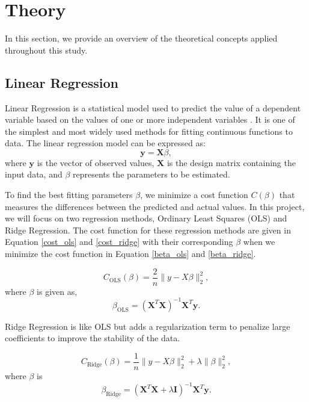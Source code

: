 \documentclass{article}
\newcommand{\0}{\mathbf{0}}
\newcommand{\1}{\mathbf{1}}
\begin{document}
\section{Theory}

In this section, we provide an overview of the theoretical concepts applied throughout this study.

\subsection{Linear Regression}

Linear Regression is a statistical model used to predict the value of a dependent variable based on the values of one or more independent variables \cite{ibm_linear_regression}. It is one of the simplest and most widely used methods for fitting continuous functions to data. The linear regression model can be expressed as:
\begin{equation}
    \bm{y} = \bm{X} \beta,
\end{equation}
where \(\bm{y}\) is the vector of observed values, \(\bm{X}\) is the design matrix containing the input data, and \(\beta\) represents the parameters to be estimated. 

To find the best fitting parameters \(\beta\), we minimize a cost function \(C(\beta)\) that measures the differences between the predicted and actual values. In this project, we will focus on two regression methods, Ordinary Least Squares (OLS) and Ridge Regression. The cost function for these regression methods are given in Equation \ref{cost_ols} and \ref{cost_ridge} with their corresponding \(\beta\) when we minimize the cost function in Equation \ref{beta_ols} and \ref{beta_ridge}. 

   \begin{equation}
       C_{\text{OLS}}(\beta) = \frac{2}{n} \| y - X\beta \|_2^2,
       \label{cost_ols}
   \end{equation}
where \(\beta\) is given as, 
   \begin{equation}
       \beta_{\text{OLS}} = (\bm{X}^T \bm{X})^{-1} \bm{X}^T \bm{y}.
       \label{beta_ols}
   \end{equation}

Ridge Regression is like OLS but adds a regularization term to penalize large coefficients to improve the stability of the data. 

\begin{equation}
       C_{\text{Ridge}}(\beta) = \frac{1}{n} \| y - X\beta \|_2^2 + \lambda \| \beta \|_2^2,
       \label{cost_ridge}
\end{equation}
where \(\beta\) is 
\begin{equation}
       \beta_{\text{Ridge}} = (\bm{X}^T \bm{X} + \lambda \bm{I})^{-1} \bm{X}^T \bm{y}.
       \label{beta_ridge}
\end{equation}
\end{document}
